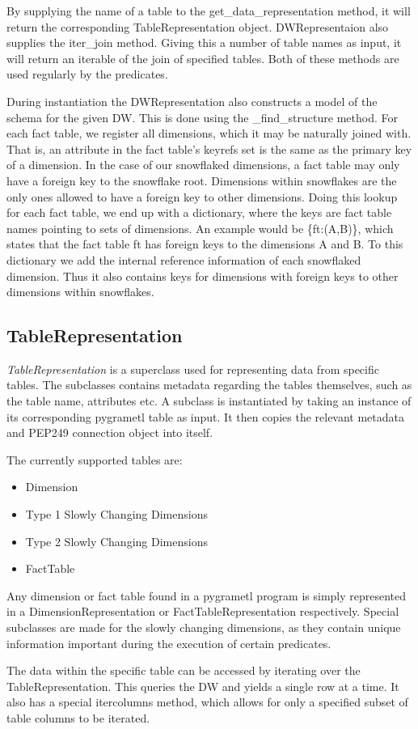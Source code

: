 By supplying the name of a table to the get\_data\_representation method, it will return the corresponding TableRepresentation object. DWRepresentaion also supplies the iter\_join method. Giving this a number of table names as input, it will return an iterable of the join of specified tables. Both of these methods are used regularly by the predicates.

During instantiation the DWRepresentation also constructs a model of the schema for the given DW. This is done using the \_find\_structure method. For each fact table, we register all dimensions, which it may be naturally joined with. That is, an attribute in the fact table’s keyrefs set is the same as the primary key of a dimension. In the case of our snowflaked dimensions, a fact table may only have a foreign key to the snowflake root. Dimensions within snowflakes are the only ones allowed to have a foreign key to other dimensions. Doing this lookup for each fact table, we end up with a dictionary, where the keys are fact table names pointing to sets of dimensions. An example would be \{ft:(A,B)\}, which states that the fact table ft has foreign keys to the dimensions A and B. To this dictionary we add the internal reference information of each snowflaked dimension. Thus it also contains keys for dimensions with foreign keys to other dimensions within snowflakes.

\subsection{TableRepresentation}
\textit{TableRepresentation} is a superclass used for representing data from specific tables. The subclasses contains metadata regarding the tables themselves, such as the table name, attributes etc. A subclass is instantiated by taking an instance of its corresponding pygrametl table as input. It then copies the relevant metadata and PEP249 connection object into itself.

The currently supported tables are:

\begin{itemize}
\item Dimension
\item Type 1 Slowly Changing Dimensions
\item Type 2 Slowly Changing Dimensions
\item FactTable
\end{itemize}

Any dimension or fact table found in a pygrametl program is simply represented in a DimensionRepresentation or FactTableRepresentation respectively. Special subclasses are made for the slowly changing dimensions, as they contain unique information important during the execution of certain predicates.

The data within the specific table can be accessed by iterating over the TableRepresentation. This queries the DW and yields a single row at a time. It also has a special itercolumns method, which allows for only a specified subset of table columns to be iterated. 







